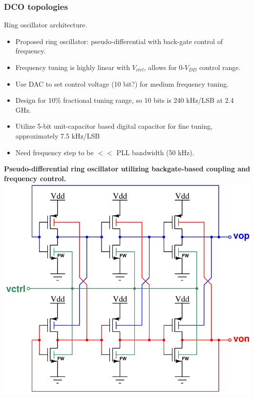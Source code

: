 \documentclass[t, screen, aspectratio=43]{beamer}
\begin{document}
\begin{frame}
	\frametitle{DCO topologies}
	\begin{block}{Ring oscillator architecture.}
	\begin{minipage}{6cm}
		\vspace{1em}
		\begin{itemize}
			\scriptsize
			\item Proposed ring oscillator: pseudo-differential with back-gate control of frequency.
			\item Frequency tuning is highly linear with $V_{ctrl}$, allows for 0-$V_{DD}$ control range.
			\item Use DAC to set control voltage (10 bit?) for medium frequency tuning.
			\item Design for 10\% fractional tuning range, so 10 bits is 240 kHz/LSB at 2.4 GHz.
			\item Utilize 5-bit unit-capacitor based digital capacitor for fine tuning, approximately 7.5 kHz/LSB
			\item Need frequency step to be $<<$ PLL bandwidth (50 kHz).
		\end{itemize} 	
		\end{minipage}
		\begin{minipage}{5cm}
				\vspace{1em}
			\tiny
			\textbf{Pseudo-differential ring oscillator utilizing backgate-based coupling and frequency control.}
			\center\includegraphics[width=1.0\textwidth, angle=0]{pseudodiff_ro.pdf}
		\end{minipage}
	\end{block}
\end{frame}
\end{document}
